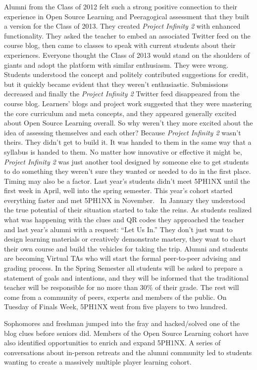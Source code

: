 Alumni from the Class of 2012 felt such a strong positive connection to
their experience in Open Source Learning and Peeragogical assessment
that they built a version for the Class of 2013. They created
\emph{Project Infinity 2} with enhanced functionality. They asked the
teacher to embed an associated Twitter feed on the course blog, then
came to classes to speak with current students about their experiences.
Everyone thought the Class of 2013 would stand on the shoulders of
giants and adopt the platform with similar enthusiasm. They were wrong.
Students understood the concept and politely contributed suggestions for
credit, but it quickly became evident that they weren't enthusiastic.
Submissions decreased and finally the \emph{Project Infinity 2} Twitter
feed disappeared from the course blog. Learners' blogs and project work
suggested that they were mastering the core curriculum and meta
concepts, and they appeared generally excited about Open Source Learning
overall. So why weren't they more excited about the idea of assessing
themselves and each other? Because \emph{Project Infinity 2} wasn't
theirs. They didn't get to build it. It was handed to them in the same
way that a syllabus is handed to them. No matter how innovative or
effective it might be, \emph{Project Infinity 2} was just another tool
designed by someone else to get students to do something they weren't
sure they wanted or needed to do in the first place. Timing may also be
a factor. Last year's students didn't meet 5PH1NX until the first week
in April, well into the spring semester. This year's cohort started
everything faster and met 5PH1NX in November.~ In January they
understood the true potential of their situation started to take the
reins. As students realized what was happening with the clues and QR
codes they approached the teacher and last year's alumni with a request:
``Let Us In.'' They don't just want to design learning materials or
creatively demonstrate mastery, they want to chart their own course and
build the vehicles for taking the trip. Alumni and students are becoming
Virtual TAs who will start the formal peer-to-peer advising and grading
process. In the Spring Semester all students will be asked to prepare a
statement of goals and intentions, and they will be informed that the
traditional teacher will be responsible for no more than 30\% of their
grade. The rest will come from a community of peers, experts and members
of the public. On Tuesday of Finals Week, 5PH1NX went from five players
to two hundred. 

 Sophomores and freshman jumped into the
fray and hacked/solved one of the blog clues before seniors did. Members
of the Open Source Learning cohort have also identified opportunities to
enrich and expand 5PH1NX. A series of conversations about in-person
retreats and the alumni community led to students wanting to create a
massively multiple player learning cohort. 

